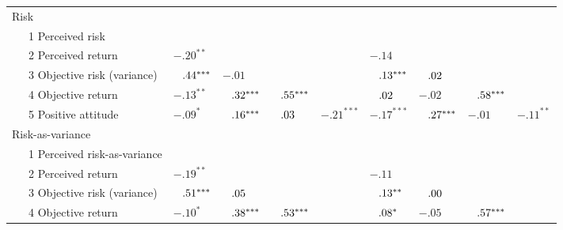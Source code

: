\begin{table}
{\begin{longtable}{lllllllll}
\midrule                                                                                                                                                        
\endhead                                                                                                                                                        
Risk &  &  &  &  &  &  &  & \\                                                                                                                                  
\ \ \ 1 Perceived risk &  &  &  &  &  &  &  & \\                                                                                                                
\ \ \ 2 Perceived return & $-.20^{**}$ &  &  &  & $-.14$ &  &  & \\                                                                                           
\ \ \ 3 Objective risk (variance) & $\hphantom{-}.44^{***}$ & $-.01$ &  &  & $\hphantom{-}.13^{***}$ & $\hphantom{-}.02$ &  & \\                            
\ \ \ 4 Objective return & $-.13^{**}$ & $\hphantom{-}.32^{***}$ & $\hphantom{-}.55^{***}$ &  & $\hphantom{-}.02$ & $-.02$ & $\hphantom{-}.58^{***}$ & \\ 
\ \ \ 5 Positive attitude & $-.09^{*}$ & $\hphantom{-}.16^{***}$ & $\hphantom{-}.03$ & $-.21^{***}$ & $-.17^{***}$ & $\hphantom{-}.27^{***}$ & $-.01$ & $-.11^{**}$\\                                                                                                                                                   
Risk-as-variance &  &  &  &  &  &  &  & \\                                                                                                                      
\ \ \ 1 Perceived risk-as-variance &  &  &  &  &  &  &  & \\                                                                                                    
\ \ \ 2 Perceived return & $-.19^{**}$ &  &  &  & $-.11$ &  &  & \\                                                                                           
\ \ \ 3 Objective risk (variance) & $\hphantom{-}.51^{***}$ & $\hphantom{-}.05$ &  &  & $\hphantom{-}.13^{**}$ & $\hphantom{-}.00$ &  & \\                  
\ \ \ 4 Objective return & $-.10^{*}$ & $\hphantom{-}.38^{***}$ & $\hphantom{-}.53^{***}$ &  & $\hphantom{-}.08^{*}$ & $-.05$ & $\hphantom{-}.57^{***}$ & 

\end{longtable}}
\end{table}
